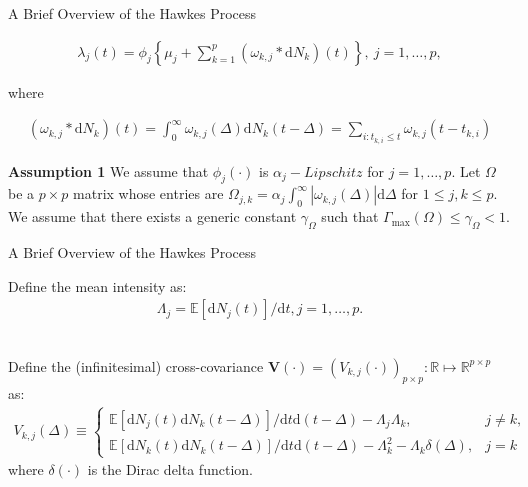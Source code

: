 \documentclass{beamer}		%
\newcommand{\dd}{\mathrm{d}}
\begin{document}
\begin{frame}{A Brief Overview of the Hawkes Process}

\begin{align}
\lambda_j(t) = \phi_j \left\{\mu_j + \sum_{k=1}^p (\omega_{k,j} * \dd N_k)(t) \right\},\ j=1,\ldots,p,
\end{align}

where

\begin{align*}
(\omega_{k,j} * \dd N_k)(t) = \int_0^\infty \omega_{k,j}(\Delta)\dd N_k(t-\Delta) = \sum_{i:t_{k,i}\leq t} \omega_{k,j}(t-t_{k,i})
\end{align*}

\textbf{Assumption 1} We assume that $\phi_j(\cdot)$ is $\alpha_j-Lipschitz$ for $j=1,\ldots,p$. Let $\Omega$ be a $p \times p$ matrix whose entries are $\Omega_{j,k} = \alpha_j \int_0^\infty |\omega_{k,j}(\Delta)| \dd \Delta$ for $1 \leq j, k \leq p$. We assume that there exists a generic constant $\gamma_\Omega$ such that $\Gamma_{\max}(\Omega) \leq \gamma_\Omega < 1$.

\end{frame}







\begin{frame}{A Brief Overview of the Hawkes Process}

Define the mean intensity as:
\begin{align}
\Lambda_j = \mathbb{E}[\dd N_j(t)]/\dd t, j = 1, \ldots, p.
\end{align}

~\\
Define the (infinitesimal) cross-covariance $\bm{V}(\cdot) = (V_{k,j}(\cdot))_{p \times p}:\mathbb{R} \mapsto \mathbb{R}^{p \times p} $ as:
\begin{align}
V_{k,j}(\Delta) \equiv 
    \begin{cases} 
    \mathbb{E}[\dd N_j(t)\dd N_k(t-\Delta)]/{\dd t \dd (t-\Delta)}-\Lambda_j \Lambda_k,  & j \ne k,  \\
    \mathbb{E}[\dd N_k(t)\dd N_k(t-\Delta)]/{\dd t \dd (t-\Delta)}-\Lambda_k^2-\Lambda_k \delta(\Delta),  & j = k
    \end{cases}
\end{align}
where $\delta(\cdot)$ is the Dirac delta function.

\end{frame}
\end{document}
